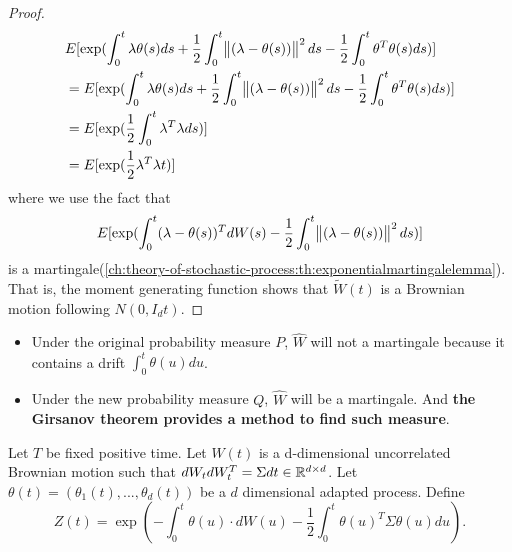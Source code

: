 \begin{refsection}
\begin{proof}
\begin{align*}
	&E[\exp(\int_0^t \lambda\theta(s)ds+ \frac{1}{2}\int_0^t \norm{(\lambda-\theta(s))}^2ds- \frac{1}{2}\int_0^t \theta^T\theta(s)ds)] \\
	&=E[\exp(\int_0^t \lambda\theta(s)ds+ \frac{1}{2}\int_0^t \norm{(\lambda-\theta(s))}^2ds- \frac{1}{2}\int_0^t \theta^T\theta(s)ds)] \\
	&=E[\exp(\frac{1}{2}\int_0^t \lambda^T\lambda ds)] \\
	&=E[\exp(\frac{1}{2}\lambda^T\lambda t)] 
	\end{align*}
	where we use the fact that $$E[\exp(\int_0^t (\lambda-\theta(s))^TdW(s) - \frac{1}{2}\int_0^t \norm{(\lambda-\theta(s))}^2ds)]$$ is a martingale(\autoref{ch:theory-of-stochastic-process:th:exponentialmartingalelemma}). 
	That is, the moment generating function shows that $\tilde{W}(t)$ is a Brownian motion following $N(0,I_dt)$.
\end{proof}

\begin{remark}[interpretation]\hfill
	\begin{itemize}
		\item Under the original probability measure $P$, $\hat{W}$ will not a martingale because it contains a drift $\int_0^t \theta(u)du$.
		\item Under the new probability measure $Q$, $\hat{W}$ will be a martingale. And \textbf{the Girsanov theorem provides a method to find such measure}.
	\end{itemize}
\end{remark}




\begin{corollary}\label{ch:theory-of-stochastic-process:th:changeOfMeasureCorrelatedBrownianMotion}
	Let $T$ be fixed positive time. Let $W(t)$ is a d-dimensional uncorrelated Brownian motion such that $dW_tdW_t^T = \Sigma dt\in \mathbb{R}^{d\times d}$. Let $\theta(t) = (\theta_1(t),...,\theta_d(t))$ be a $d$ dimensional adapted process. Define
	$$Z(t) = \exp(-\int_0^t \theta(u)\cdot dW(u) - \frac{1}{2} \int_0^t \theta(u)^T \Sigma \theta(u) du).$$
	

\end{corollary}
\end{refsection}
